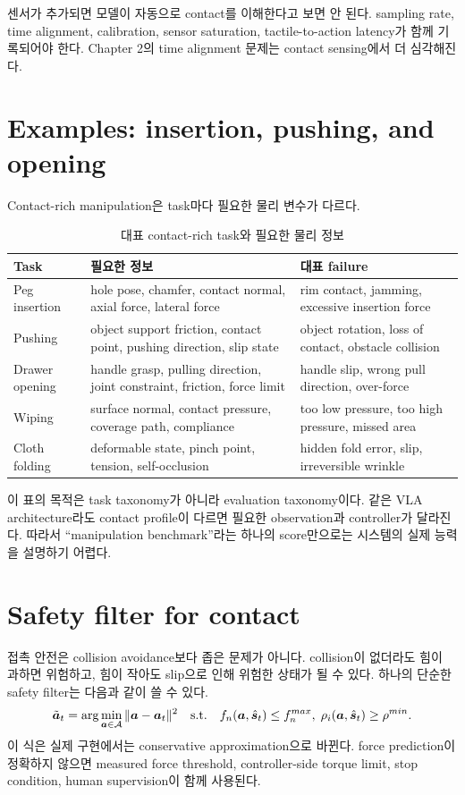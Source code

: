 센서가 추가되면 모델이 자동으로 contact를 이해한다고 보면 안 된다. sampling rate, time alignment, calibration, sensor saturation, tactile-to-action latency가 함께 기록되어야 한다. Chapter 2의 time alignment 문제는 contact sensing에서 더 심각해진다.

\section{Examples: insertion, pushing, and opening}

Contact-rich manipulation은 task마다 필요한 물리 변수가 다르다.

\begin{table}[ht]
\centering
\caption{대표 contact-rich task와 필요한 물리 정보}
\label{tab:contact-rich-examples}
\small
\begin{tabularx}{\textwidth}{p{26mm}X X}
\toprule
Task & 필요한 정보 & 대표 failure \\
\midrule
Peg insertion & hole pose, chamfer, contact normal, axial force, lateral force & rim contact, jamming, excessive insertion force \\
Pushing & object support friction, contact point, pushing direction, slip state & object rotation, loss of contact, obstacle collision \\
Drawer opening & handle grasp, pulling direction, joint constraint, friction, force limit & handle slip, wrong pull direction, over-force \\
Wiping & surface normal, contact pressure, coverage path, compliance & too low pressure, too high pressure, missed area \\
Cloth folding & deformable state, pinch point, tension, self-occlusion & hidden fold error, slip, irreversible wrinkle \\
\bottomrule
\end{tabularx}
\end{table}

이 표의 목적은 task taxonomy가 아니라 evaluation taxonomy이다. 같은 VLA architecture라도 contact profile이 다르면 필요한 observation과 controller가 달라진다. 따라서 ``manipulation benchmark''라는 하나의 score만으로는 시스템의 실제 능력을 설명하기 어렵다.

\section{Safety filter for contact}

접촉 안전은 collision avoidance보다 좁은 문제가 아니다. collision이 없더라도 힘이 과하면 위험하고, 힘이 작아도 slip으로 인해 위험한 상태가 될 수 있다. 하나의 단순한 safety filter는 다음과 같이 쓸 수 있다.
\begin{equation}
  \tilde{\bm{a}}_t
  =
  \arg\min_{\bm{a}\in\mathcal{A}}
  \|\bm{a}-\bm{a}_t\|^2
  \quad
  \text{s.t.}\quad
  f_n(\bm{a},\hat{\bm{s}}_t)\le f_n^{max},
  \;
  \rho_i(\bm{a},\hat{\bm{s}}_t)\ge \rho^{min}.
  \label{eq:contact-safety-filter}
\end{equation}
이 식은 실제 구현에서는 conservative approximation으로 바뀐다. force prediction이 정확하지 않으면 measured force threshold, controller-side torque limit, stop condition, human supervision이 함께 사용된다.

